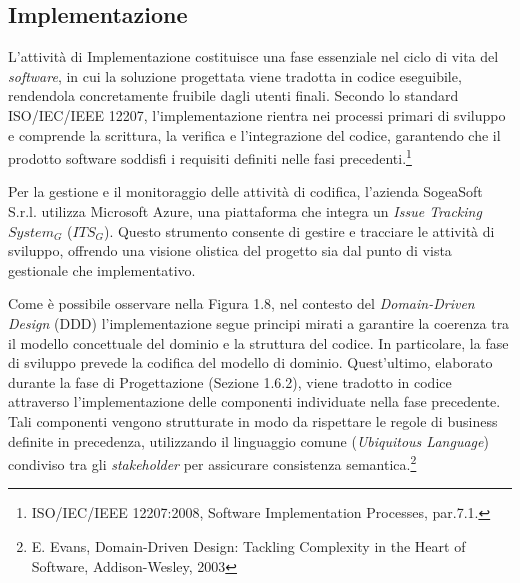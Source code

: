         \subsection{Implementazione}
        
        L'attività di Implementazione costituisce una fase essenziale nel ciclo di vita del \textit{software}, in cui la soluzione progettata viene tradotta in codice eseguibile, rendendola concretamente fruibile dagli utenti finali. Secondo lo standard ISO/IEC/IEEE 12207, l'implementazione rientra nei processi primari di sviluppo e comprende la scrittura, la verifica e l'integrazione del codice, garantendo che il prodotto software soddisfi i requisiti definiti nelle fasi precedenti.\footnote{ISO/IEC/IEEE 12207:2008, Software Implementation Processes, par.7.1.} 

        \vspace{0.2 em}
        \noindent Per la gestione e il monitoraggio delle attività di codifica, l'azienda SogeaSoft S.r.l. utilizza Microsoft Azure, una piattaforma che integra un \textit{Issue Tracking $System_G$} ($ITS_G$). Questo strumento consente di gestire e tracciare le attività di sviluppo, offrendo una visione olistica del progetto sia dal punto di vista gestionale che implementativo.

        \vspace{0.2 em}
        \noindent Come è possibile osservare nella Figura 1.8, nel contesto del \textit{Domain-Driven Design} (DDD) l’implementazione segue principi mirati a garantire la coerenza tra il modello concettuale del dominio e la struttura del codice. In particolare, la fase di sviluppo prevede la codifica del modello di dominio.
        Quest'ultimo, elaborato durante la fase di Progettazione (Sezione 1.6.2), viene tradotto in codice attraverso l'implementazione delle componenti individuate nella fase precedente. Tali componenti vengono strutturate in modo da rispettare le regole di business definite in precedenza, utilizzando il linguaggio comune (\textit{Ubiquitous Language}) condiviso tra gli \textit{stakeholder} per assicurare consistenza semantica.\footnote{E. Evans, Domain-Driven Design: Tackling Complexity in the Heart of Software, Addison-Wesley, 2003}

